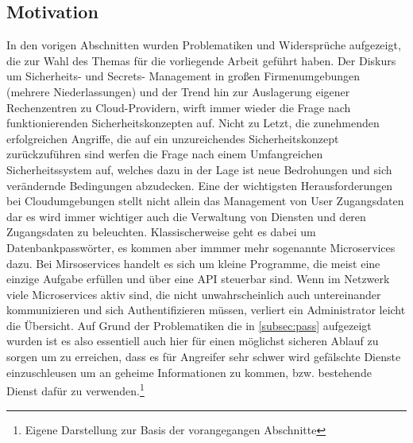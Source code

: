 \documentclass[
a4paper,   
titlepage,  
halfparskip,
12pt        
]{scrartcl}
\begin{document}
\begin{onehalfspacing}
\subsection{Motivation}
In den vorigen Abschnitten wurden Problematiken und Widersprüche aufgezeigt, die zur Wahl des Themas für die vorliegende Arbeit geführt haben. Der Diskurs um Sicherheits- und Secrets- Management in großen Firmenumgebungen (mehrere Niederlassungen) und der Trend hin zur Auslagerung eigener Rechenzentren zu Cloud-Providern, wirft immer wieder die Frage nach funktionierenden Sicherheitskonzepten auf. Nicht zu Letzt, die zunehmenden erfolgreichen Angriffe, die auf ein unzureichendes Sicherheitskonzept zurückzuführen sind werfen die Frage nach einem Umfangreichen Sicherheitssystem auf, welches dazu in der Lage ist neue Bedrohungen und sich verändernde Bedingungen abzudecken. 
Eine der wichtigsten Herausforderungen bei Cloudumgebungen stellt nicht allein das Management von User Zugangsdaten dar es wird immer wichtiger auch die Verwaltung von Diensten und deren Zugangsdaten zu beleuchten. Klassischerweise geht es dabei um Datenbankpasswörter, es kommen aber immmer mehr sogenannte Microservices dazu. Bei Mirsoservices handelt es sich um kleine Programme, die meist eine einzige Aufgabe erfüllen und über eine \ac{API} steuerbar sind. Wenn im Netzwerk viele Microservices aktiv sind, die nicht unwahrscheinlich auch untereinander kommunizieren und sich Authentifizieren müssen, verliert ein Administrator leicht die Übersicht. Auf Grund der Problematiken die in \autoref{subsec:pass} aufgezeigt wurden ist es also essentiell auch hier für einen möglichst sicheren Ablauf zu sorgen um zu erreichen, dass es für Angreifer sehr schwer wird gefälschte Dienste einzuschleusen um an geheime Informationen zu kommen, bzw. bestehende Dienst dafür zu verwenden.\footnote{Eigene Darstellung zur Basis der vorangegangen Abschnitte}


\end{onehalfspacing}
\end{document}
